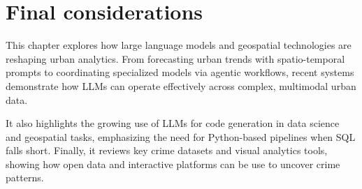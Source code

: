 

\section{Final considerations}

This chapter explores how large language models and geospatial technologies are reshaping urban analytics. From forecasting urban trends with spatio-temporal prompts to coordinating specialized models via agentic workflows, recent systems demonstrate how LLMs can operate effectively across complex, multimodal urban data.

It also highlights the growing use of LLMs for code generation in data science and geospatial tasks, emphasizing the need for Python-based pipelines when SQL falls short. Finally, it reviews key crime datasets and visual analytics tools, showing how open data and interactive platforms can be use to uncover crime patterns.




